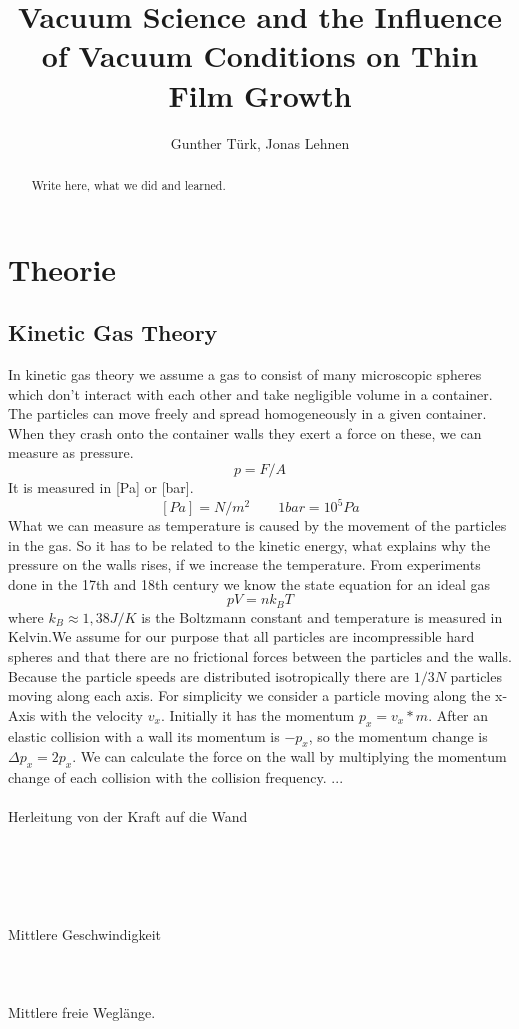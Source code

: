 \documentclass[]{article}
\title{Vacuum Science and the Inﬂuence of Vacuum Conditions on Thin Film Growth}
\author{Gunther Türk, Jonas Lehnen}
\begin{document}
\maketitle
\tableofcontents
\begin{abstract}
Write here, what we did and learned.
\end{abstract}

\section{Theorie}
\subsection{Kinetic Gas Theory}
In kinetic gas theory we assume a gas to consist of many microscopic spheres which don't interact with each other and take negligible volume in a container. The particles can move freely and spread homogeneously in a given container. When they crash onto the container walls they exert a force on these, we can measure as pressure. 
\[ p=F/A \]
It is measured in [Pa] or [bar].
\[ [Pa]=N/m^{2}     \qquad  1bar=10^{5}Pa		 \]
What we can measure as temperature is caused by the movement of the particles in the gas. So it has to be related to the kinetic energy, what explains why the pressure on the walls rises, if we increase the temperature. From experiments done in the 17th and 18th century we know the state equation for an ideal gas
\[ pV=nk_{B} T\]
 where $k_{B}\approx1,38J/K$ is the Boltzmann constant and temperature is measured in Kelvin.We assume for our purpose that all particles are incompressible hard spheres and that there are no frictional forces between the particles and the walls. Because the particle speeds are distributed isotropically there are $1/3N$ particles moving along each axis. For simplicity we consider a particle moving along the x-Axis with the velocity $v_{x}$. Initially it has the momentum $p_{x}=v_{x}*m$. After an elastic collision with a wall its momentum is $-p_{x}$, so the momentum change is $\Delta p_{x}=2p_{x}$. We can calculate the force on the wall by multiplying the momentum change of each collision with the collision frequency. ...\\\\
 Herleitung von der Kraft auf die Wand \\\\\\\\\\\\
Mittlere Geschwindigkeit
\\\\\\\\
Mittlere freie Weglänge.
\end{document}
